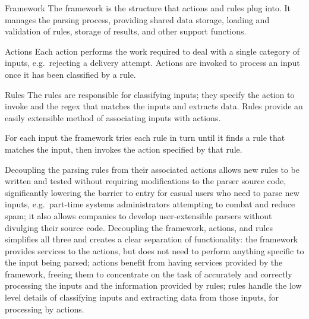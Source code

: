 \begin{eqlist}

    \item [Framework]  The framework is the structure that actions and
        rules plug into.  It manages the parsing process, providing shared
        data storage, loading and validation of rules, storage of results,
        and other support functions.

    \item [Actions] Each action performs the work required to deal with a
        single category of inputs, e.g.\ rejecting a delivery attempt.
        Actions are invoked to process an input once it has been classified
        by a rule.

    \item [Rules]  The rules are responsible for classifying inputs; they
        specify the action to invoke and the regex that matches the inputs
        and extracts data.  Rules provide an easily extensible method of
        associating inputs with actions.

\end{eqlist}

For each input the framework tries each rule in turn until it finds a rule
that matches the input, then invokes the action specified by that rule.

\label{why separate rules, actions, and framework?}

Decoupling the parsing rules from their associated actions allows new rules
to be written and tested without requiring modifications to the parser
source code, significantly lowering the barrier to entry for casual users
who need to parse new inputs, e.g.\ part-time systems administrators
attempting to combat and reduce spam; it also allows companies to develop
user-extensible parsers without divulging their source code.  Decoupling
the framework, actions, and rules simplifies all three and creates a clear
separation of functionality: the framework provides services to the
actions, but does not need to perform anything specific to the input being
parsed; actions benefit from having services provided by the framework,
freeing them to concentrate on the task of accurately and correctly
processing the inputs and the information provided by rules; rules handle
the low level details of classifying inputs and extracting data from those
inputs, for processing by actions.

